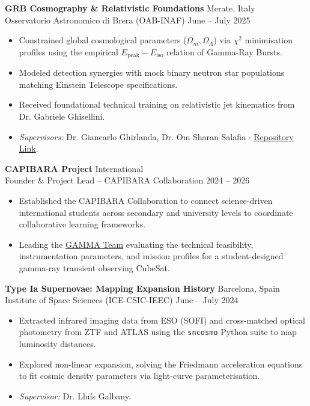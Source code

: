 \documentclass[10pt,a4paper]{article}
\begin{document}
\textbf{GRB Cosmography \& Relativistic Foundations} \hfill Merate, Italy \\
Osservatorio Astronomico di Brera (OAB-INAF) \hfill June -- July 2025
\begin{itemize}
    \itemsep0em 
    \item Constrained global cosmological parameters ($\Omega_m, \Omega_\Lambda$) via $\chi^2$ minimisation profiles using the empirical $E_{\text{peak}}-E_{\text{iso}}$ relation of Gamma-Ray Bursts.
    \item Modeled detection synergies with mock binary neutron star populations matching Einstein Telescope specifications.
    \item Received foundational technical training on relativistic jet kinematics from Dr. Gabriele Ghisellini.
    \item \textit{Supervisors:} Dr. Giancarlo Ghirlanda, Dr. Om Sharan Salafia $\cdot$ \href{https://github.com/joanalnu/oab-inaf}{Repository Link}.
\end{itemize}

\textbf{CAPIBARA Project} \hfill International \\
Founder \& Project Lead -- CAPIBARA Collaboration \hfill 2024 -- 2026
\begin{itemize}
    \itemsep0em 
    \item Established the CAPIBARA Collaboration to connect science-driven international students across secondary and university levels to coordinate collaborative learning frameworks.
    \item Leading the \href{https://capibara3.github.io/gamma/}{GAMMA Team} evaluating the technical feasibility, instrumentation parameters, and mission profiles for a student-designed gamma-ray transient observing CubeSat.
\end{itemize}

\textbf{Type Ia Supernovae: Mapping Expansion History} \hfill Barcelona, Spain \\
Institute of Space Sciences (ICE-CSIC-IEEC) \hfill June -- July 2024
\begin{itemize}
    \itemsep0em 
    \item Extracted infrared imaging data from ESO (SOFI) and cross-matched optical photometry from ZTF and ATLAS using the \texttt{sncosmo} Python suite to map luminosity distances.
    \item Explored non-linear expansion, solving the Friedmann acceleration equations to fit cosmic density parameters via light-curve parameterisation.
    \item \textit{Supervisor:} Dr. Lluís Galbany.
\end{itemize}
\end{document}
